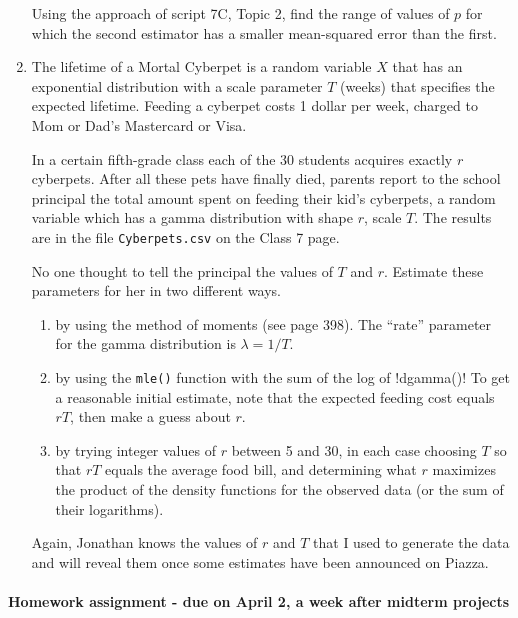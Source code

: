 \documentclass[12pt]{article}
\begin{document}
\begin{enumerate}
Using the approach of script 7C, Topic 2, find the range of values of $p$ for which the second estimator has a smaller mean-squared error than the first.

\pagebreak

\item The lifetime of a Mortal Cyberpet is a random variable $X$ that has an exponential distribution with a scale parameter $T$ (weeks) that specifies the expected lifetime. Feeding a cyberpet costs 1 dollar per week, charged to  Mom or Dad's Mastercard or Visa.

In a certain fifth-grade class each of the 30 students acquires exactly $r$ cyberpets. After all these pets have finally died, parents report to the school principal the total amount spent on feeding their kid's cyberpets, a random variable which has a gamma distribution with shape $r$, scale  $T$. The results are in the file \verb!Cyberpets.csv! on the Class 7 page.

No one thought to tell the principal the values of $T$ and $r$. Estimate these parameters for her in two different ways.

\begin{enumerate}
\item by using the method of moments (see page 398). The ``rate'' parameter for the gamma distribution is $\lambda = 1/T.$
\item by using the \verb!mle()! function with the sum of the log of !dgamma()! To get a reasonable initial estimate, note that the expected feeding cost equals $rT$, then make a guess about $r$.
\item by trying integer values of $r$ between 5 and 30, in each case choosing $T$ so that $rT$ equals the average food bill, and determining what $r$ maximizes the product of the density functions for the observed data (or the sum of their logarithms). 
\end{enumerate}

Again, Jonathan knows the values of $r$ and $T$ that I used to generate the data and will reveal them once some estimates have been announced on Piazza.



\end{enumerate}





\pagebreak


\paragraph*{Homework assignment - due on April 2, a week after midterm projects }
\end{document}
